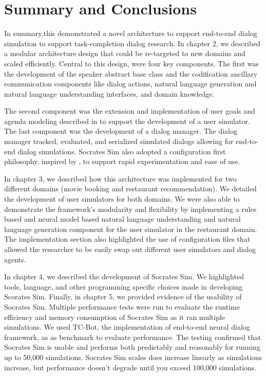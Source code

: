
\chapter{Summary and Conclusions}
\label{chap:conclusions}

In summary,this demonstrated a novel architecture to support end-to-end dialog simulation to support task-completion dialog research. In chapter 2, we described a modular architecture design that could be re-targeted to new domains and scaled efficiently. Central to this design, were four key components. The first was the development of the speaker abstract base class and the codification ancillary communication components like dialog actions, natural language generation and natural language understanding interfaces, and domain knowledge. 

The second component was the extension and implementation of user goals and agenda modeling described in \cite{Schatzmann2009TheHA} to support the development of a user simulator. The last component was the development of a dialog manager. The dialog manager tracked, evaluated, and serialized simulated dialogs allowing for end-to-end dialog simulations. Socrates Sim also adopted a configuration first philosophy, inspired by \cite{Gardner_allennlp}, to support rapid experimentation and ease of use. 

In chapter 3, we described how this architecture was implemented for two different domains (movie booking and restaurant recommendation). We detailed the development of user simulators for both domains. We were also able to demonstrate the framework's modularity and flexibility by implementing a rules based and neural model based natural language understanding and natural language generation component for the user simulator in the restaurant domain. The implementation section also highlighted the use of configuration files that allowed the researcher to be easily swap out different user simulators and dialog agents.  

In chapter 4, we described the development of Socrates Sim. We highlighted tools, language, and other programming specific choices made in developing Scorates Sim. Finally, in chapter 5, we provided evidence of the usability of Socrates Sim. Multiple performance tests were run to evaluate the runtime efficiency and memory consumption of Socrates Sim as it ran multiple simulations. We used TC-Bot, the implementation of \cite{li_end_to_end} end-to-end neural dialog framework, as as benchmark to evaluate performance. The testing confirmed that Socrates Sim is usable and performs both predictably and reasonably for running  up to 50,000 simulations. Socrates Sim scales does increase linearly as simulations increase, but performance doesn't degrade until you exceed 100,000 simulations. 

